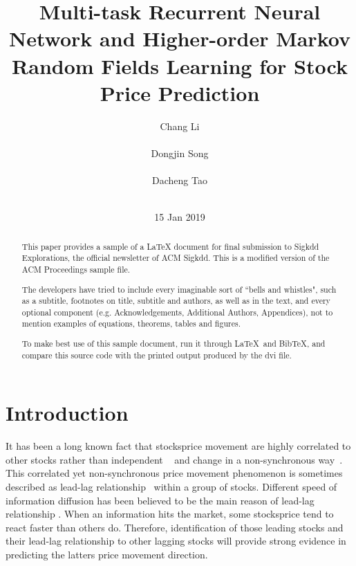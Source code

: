 \documentclass[sigconf, anonymous, review]{acmart}
\renewcommand{\cite}{\citep}
\begin{document}
\title{ Multi-task Recurrent Neural Network and
  Higher-order Markov Random Fields Learning for Stock Price
  Prediction}


\author{
\alignauthor Chang Li \\
       \\
\alignauthor Dongjin Song \\
       \\
\alignauthor Dacheng Tao\\
       \\
}
\date{15 Jan 2019}
\maketitle

\begin{abstract}
This paper provides a sample of a LaTeX document for final submission
to Sigkdd Explorations, the official newsletter of ACM Sigkdd. This is
a modified version of the ACM Proceedings sample file.

The developers have tried to include every imaginable sort
of ``bells and whistles", such as a subtitle, footnotes on
title, subtitle and authors, as well as in the text, and
every optional component (e.g. Acknowledgements, Additional
Authors, Appendices), not to mention examples of
equations, theorems, tables and figures.

To make best use of this sample document, run it through \LaTeX\
and BibTeX, and compare this source code with the printed
output produced by the dvi file.
\end{abstract}

\section{Introduction}
It has been a long known fact that stocks\textquotesingle price movement are
highly correlated to other stocks rather than independent
~\cite{lo1990contrarian,mech1993portfolio} and change in a
non-synchronous
way~\cite{lo1990contrarian,brennan1993investment}. This
correlated yet non-synchronous price movement phenomenon is
sometimes described as lead-lag
relationship~\cite{hou2007industry} within a group of stocks.
Different speed of information diffusion has been believed to be
the main reason of lead-lag relationship
\cite{lo1990contrarian,badrinath1995shepherds,mcqueen1996delayed}.
When an information hits the market, some stocks\textquotesingle price tend to
react faster than others do. Therefore, identification of those
leading stocks and their lead-lag relationship to other lagging
stocks will provide strong evidence in predicting the latter\textquotesingle s
price movement direction.
\end{document}
